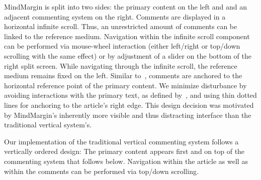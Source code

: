 MindMargin is split into two sides: the primary content on the left and and an adjacent commenting system on the right. Comments are displayed in a horizontal infinite scroll. Thus, an unrestricted amount of comments can be linked to the reference medium. Navigation within the infinite scroll component can be performed via mouse-wheel interaction (either left/right or top/down scrolling with the same effect) or by adjustment of a slider on the bottom of the right split screen. While navigating through the infinite scroll, the reference medium remains fixed on the left. Similar to~\cite{FluidDocs, NB}, comments are anchored to the horizontal reference point of the primary content. We minimize disturbance by avoiding interactions with the primary text, as defined by~\cite{FluidDocs}, and using thin dotted lines for anchoring to the article's right edge. This design decision was motivated by MindMargin's inherently more visible and thus distracting interface than the traditional vertical system's. 

Our implementation of the traditional vertical commenting system follows a vertically ordered design: The primary content appears first and on top of the commenting system that follows below. Navigation within the article as well as within the comments can be performed via top/down scrolling.%